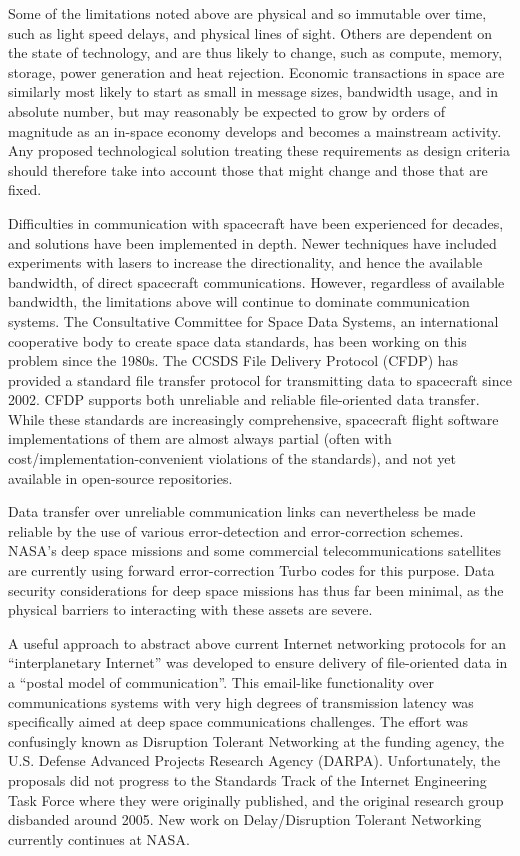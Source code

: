 \documentclass[]{aiaa-tc}%
\begin{document}
Some of the limitations noted above are physical and so immutable over time, such as light speed delays, and physical lines of sight. Others are dependent on the state of technology, and are thus likely to change, such as compute, memory, storage, power generation and heat rejection. Economic transactions in space are similarly most likely to start as small in message sizes, bandwidth usage, and in absolute number, but may reasonably be expected to grow by orders of magnitude as an in-space economy develops and becomes a mainstream activity. Any proposed technological solution treating these requirements as design criteria should therefore take into account those that might change and those that are fixed.

Difficulties in communication with spacecraft have been experienced for decades, and solutions have been implemented in depth. Newer techniques have included experiments with lasers to increase the directionality, and hence the available bandwidth, of direct spacecraft communications. However, regardless of available bandwidth, the limitations above will continue to dominate communication systems. The Consultative Committee for Space Data Systems, an international cooperative body to create space data standards, has been working on this problem since the 1980s. The CCSDS File Delivery Protocol (CFDP) has provided a standard file transfer protocol for transmitting data to spacecraft since 2002\cite{CCSDS_2007}. CFDP supports both unreliable and reliable file-oriented data transfer. While these standards are increasingly comprehensive, spacecraft flight software implementations of them are almost always partial (often with cost/implementation-convenient violations of the standards), and not yet available in open-source repositories.

Data transfer over unreliable communication links can nevertheless be made reliable by the use of various error-detection and error-correction schemes. NASA's deep space missions and some commercial telecommunications satellites are currently using forward error-correction Turbo codes\cite{berrou_near_1993} for this purpose.  Data security considerations for deep space missions has thus far been minimal, as the physical barriers to interacting with these assets are severe.

A useful approach to abstract above current Internet networking protocols for an ``interplanetary Internet'' was developed to ensure delivery of file-oriented data in a ``postal model of communication''\cite{burleigh_delay-tolerant_2003}. This email-like functionality over communications systems with very high degrees of transmission latency was specifically aimed at deep space communications challenges. The effort was confusingly known as Disruption Tolerant Networking at the funding agency, the U.S. Defense Advanced Projects Research Agency (DARPA). Unfortunately, the proposals did not progress to the Standards Track of the Internet Engineering Task Force where they were originally published, and the original research group disbanded around 2005. New work on Delay/Disruption Tolerant Networking currently continues at NASA\cite{mahoney_disruption_2016}.
\end{document}
